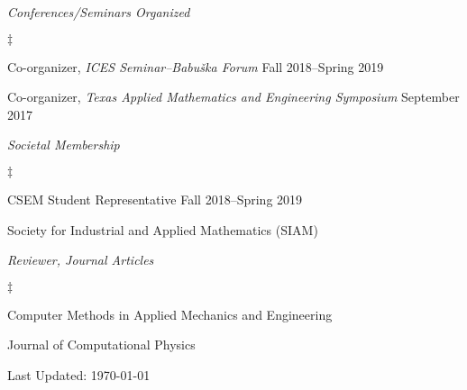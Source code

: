 \documentclass[margin,line]{res}
\newenvironment{list2}{
  \begin{list}{$\ddagger$}{%
      \setlength{\itemsep}{0in}
      \setlength{\parsep}{0in} \setlength{\parskip}{0in}
      \setlength{\topsep}{0in} \setlength{\partopsep}{0in}
      \setlength{\leftmargin}{0.2in}}}{\end{list}}
\begin{document}
\begin{resume}
\textit{Conferences/Seminars Organized}
\vspace{0.05in}
\begin{list2}
\item Co-organizer, {\em ICES Seminar--Babu\v{s}ka Forum} \hfill Fall 2018--Spring 2019
\item Co-organizer, {\em Texas Applied Mathematics and Engineering Symposium} \hfill September 2017
\end{list2}

\textit{Societal Membership}
\vspace{0.05in}
\begin{list2}
\item CSEM Student Representative \hfill Fall 2018--Spring 2019
\item Society for Industrial and Applied Mathematics (SIAM)
\end{list2}

\textit{Reviewer, Journal Articles}
\vspace{0.05in}
\begin{list2}
\item Computer Methods in Applied Mechanics and Engineering
\item Journal of Computational Physics
\end{list2}
\end{resume}
\vfill
\centerline{Last Updated: \today}
\end{document}
